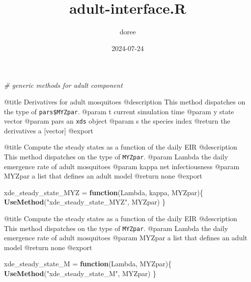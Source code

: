 \documentclass[
]{article}
\title{adult-interface.R}
\author{doree}
\date{2024-07-24}
\newenvironment{Shaded}{\begin{snugshade}}{\end{snugshade}}
\newcommand{\CommentTok}[1]{\textcolor[rgb]{0.56,0.35,0.01}{\textit{#1}}}
\newcommand{\ControlFlowTok}[1]{\textcolor[rgb]{0.13,0.29,0.53}{\textbf{#1}}}
\newcommand{\FunctionTok}[1]{\textcolor[rgb]{0.13,0.29,0.53}{\textbf{#1}}}
\newcommand{\NormalTok}[1]{#1}
\newcommand{\OtherTok}[1]{\textcolor[rgb]{0.56,0.35,0.01}{#1}}
\newcommand{\SpecialCharTok}[1]{\textcolor[rgb]{0.81,0.36,0.00}{\textbf{#1}}}
\newcommand{\StringTok}[1]{\textcolor[rgb]{0.31,0.60,0.02}{#1}}
\begin{document}
\maketitle

\begin{Shaded}
\begin{Highlighting}[]
\CommentTok{\# generic methods for adult component}
\end{Highlighting}
\end{Shaded}

@title Derivatives for adult mosquitoes @description This method
dispatches on the type of \texttt{pars\$MYZpar}. @param t current
simulation time @param y state vector @param pars an \texttt{xds} object
@param s the species index @return the derivatives a {[}vector{]}
@export

\begin{Shaded}
\end{Shaded}

@title Compute the steady states as a function of the daily EIR
@description This method dispatches on the type of \texttt{MYZpar}.
@param Lambda the daily emergence rate of adult mosquitoes @param kappa
net infectiousness @param MYZpar a list that defines an adult model
@return none @export

\begin{Shaded}
\begin{Highlighting}[]
\NormalTok{xde\_steady\_state\_MYZ }\OtherTok{=} \ControlFlowTok{function}\NormalTok{(Lambda, kappa, MYZpar)\{}
  \FunctionTok{UseMethod}\NormalTok{(}\StringTok{"xde\_steady\_state\_MYZ"}\NormalTok{, MYZpar)}
\NormalTok{\}}
\end{Highlighting}
\end{Shaded}

@title Compute the steady states as a function of the daily EIR
@description This method dispatches on the type of \texttt{MYZpar}.
@param Lambda the daily emergence rate of adult mosquitoes @param MYZpar
a list that defines an adult model @return none @export

\begin{Shaded}
\begin{Highlighting}[]
\NormalTok{xde\_steady\_state\_M }\OtherTok{=} \ControlFlowTok{function}\NormalTok{(Lambda, MYZpar)\{}
  \FunctionTok{UseMethod}\NormalTok{(}\StringTok{"xde\_steady\_state\_M"}\NormalTok{, MYZpar)}
\NormalTok{\}}
\end{Highlighting}
\end{Shaded}
\end{document}
